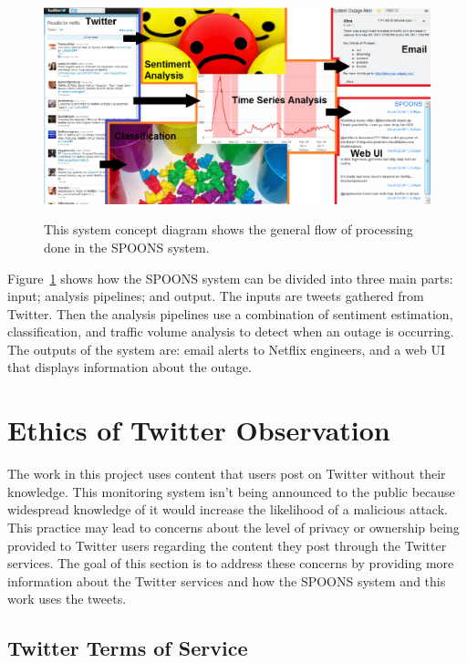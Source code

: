 \documentclass[12pt]{ucthesis}
\newcommand{\captionfonts}{\small\bf\ssp}
\begin{document}
\begin{figure}
   \begin{center}
      \includegraphics[width=140mm]{images/systemFlow.eps}
      \captionfonts
      \caption[System Concept Diagram]{This system concept diagram shows the general
                                       flow of processing done in the SPOONS system.}
      \label{fig:systemFlow}
   \end{center}
\end{figure}

Figure~\ref{fig:systemFlow} shows how the SPOONS system can be divided into three
main parts: input; analysis pipelines; and output.
The inputs are tweets gathered from Twitter. Then the
analysis pipelines use a combination of sentiment estimation, classification, and
traffic volume analysis to detect when an outage is occurring.
The outputs of the system are: email alerts to Netflix engineers, and a web UI that displays
information about the outage.

\chapter{Ethics of Twitter Observation}

The work in this project uses content that users post on Twitter without their
knowledge. This monitoring system isn't being announced to the
public because widespread knowledge of it would increase the likelihood of a
malicious attack. This practice may lead to concerns about the level of privacy
or ownership being provided to Twitter users regarding the content they post
through the Twitter services. The goal of this section is to address these
concerns by providing more information about the Twitter services and how the
SPOONS system and this work uses the tweets.

\section{Twitter Terms of Service}
\end{document}
